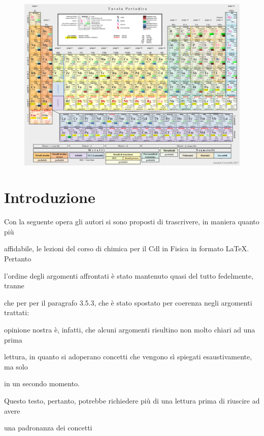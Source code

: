 \documentclass[openany,12pt]{book}%
\newcommand\blankpage{%
    \null
    \thispagestyle{empty}%
    \newpage}
\begin{document}
\begin{figure}[H]
    \includegraphics[angle=90,origin=c]{immagini/tavola periodica.png}
\end{figure}

\afterpage{\blankpage}

\tableofcontents

\chapter*{Introduzione}

Con la seguente opera gli autori si sono proposti di trascrivere, in maniera quanto più

affidabile, le lezioni del corso di chimica per il Cdl in Fisica in formato \LaTeX. Pertanto

l'ordine degli argomenti affrontati è stato mantenuto quasi del tutto fedelmente, tranne

che per per il paragrafo 3.5.3, che è stato spostato per coerenza negli argomenti trattati:

opinione nostra è, infatti, che alcuni argomenti risultino non molto chiari ad una prima

lettura, in quanto si adoperano concetti che vengono sì spiegati esaustivamente, ma solo

in un secondo momento.

\vspace{0.2cm}
Questo testo, pertanto, potrebbe richiedere più di una lettura prima di riuscire ad avere

una padronanza dei concetti
\end{document}
